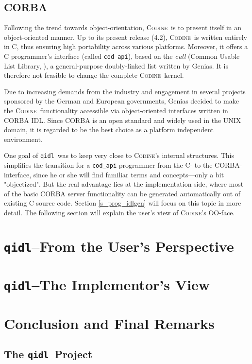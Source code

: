 \documentclass[a4paper, titlepage, twoside]{article}
\newcommand{\qidl}{{\tt qidl}}
\newcommand{\codine}{\textsc{Codine}}
\begin{document}
\subsection{\label{s_corba}CORBA}
Following the trend towards object-orientation, \codine\ is to present itself in
an object-oriented manner. Up to its present release (4.2), \codine\ is written
entirely in C, thus ensuring high portability across various platforms.
Moreover, it offers a C programmer's interface (called \texttt{cod\_api}),
based on the \textsl{cull} (Common Usable List Library, \cite{b_cull}), 
a general-purpose doubly-linked
list written by Genias. It is therefore not feasible to change the complete
\codine\ kernel.

Due to increasing demands from the industry and engagement in several
projects sponsored by the German and European governments, Genias decided to
make the \codine\ functionality accessible via object-oriented interfaces
written in CORBA IDL. Since CORBA is an open standard and widely used in the
UNIX domain, it is regarded to be the best choice as a platform independent
environment.

One goal of \qidl\ was to keep very close to \codine's internal structures.
This simplifies the transition for a \texttt{cod\_api} programmer from the C-
to the CORBA-interface, since he or she will find familiar terms and
concepts---only a bit "objectized". But the real advantage lies at the
implementation side, where most of the basic CORBA server functionality can
be generated automatically out of existing C source code. Section
\ref{s_prog_idlgen} will focus on this topic in more detail. The following
section will explain the user's view of \codine's OO-face.

\cleardoublepage
\section{\label{s_userdoc}\qidl\---From the User's Perspective}


\cleardoublepage
\section{\label{s_progdoc}\qidl\---The Implementor's View}


\cleardoublepage
\section{Conclusion and Final Remarks}
\subsection{The \qidl\ Project}
\end{document}
